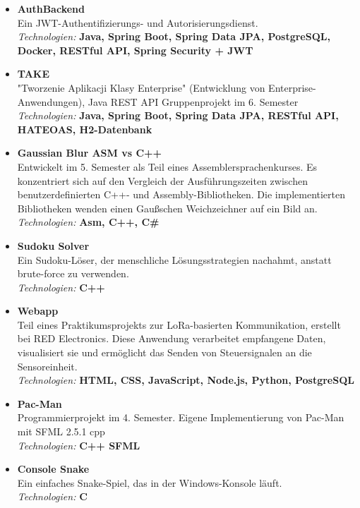 \documentclass[11pt,letterpaper]{article}
\begin{document}
\begin{itemize}[leftmargin=0.5cm]
\setlength\itemsep{0.4em}
    \item \textbf{AuthBackend} \\
    Ein JWT-Authentifizierungs- und Autorisierungsdienst.\\ [.4em]
    \textit{Technologien:} \textbf{Java, Spring Boot, Spring Data JPA, PostgreSQL, Docker, RESTful API, Spring Security + JWT}

    \item \textbf{TAKE} \\
    "Tworzenie Aplikacji Klasy Enterprise" (Entwicklung von Enterprise-Anwendungen), Java REST API Gruppenprojekt im 6. Semester\\ [.4em]
    \textit{Technologien:} \textbf{Java, Spring Boot, Spring Data JPA, RESTful API, HATEOAS, H2-Datenbank}

    \item \textbf{Gaussian Blur ASM vs C++} \\
    Entwickelt im 5. Semester als Teil eines Assemblersprachenkurses.
    Es konzentriert sich auf den Vergleich der Ausführungszeiten zwischen benutzerdefinierten C++- und Assembly-Bibliotheken.
    Die implementierten Bibliotheken wenden einen Gaußschen Weichzeichner auf ein Bild an.\\ [.3em]
    \textit{Technologien:} \textbf{Asm, C++, C\#}

    \item \textbf{Sudoku Solver} \\
    Ein Sudoku-Löser, der menschliche Lösungsstrategien nachahmt, anstatt brute-force zu verwenden.\\ [.3em]
    \textit{Technologien:} \textbf{C++}

    \item \textbf{Webapp} \\
    Teil eines Praktikumsprojekts zur LoRa-basierten Kommunikation, erstellt bei RED Electronics.
    Diese Anwendung verarbeitet empfangene Daten, visualisiert sie und ermöglicht das Senden von Steuersignalen an die Sensoreinheit.\\ [.3em]
    \textit{Technologien:} \textbf{HTML, CSS, JavaScript, Node.js, Python, PostgreSQL}

    \item \textbf{Pac-Man} \\
    Programmierprojekt im 4. Semester. Eigene Implementierung von Pac-Man mit SFML 2.5.1 cpp \\ [.3em]
    \textit{Technologien:} \textbf{C++ SFML}

    \item \textbf{Console Snake} \\
    Ein einfaches Snake-Spiel, das in der Windows-Konsole läuft.\\ [.3em]
    \textit{Technologien:} \textbf{C}

\end{itemize}
\end{document}
